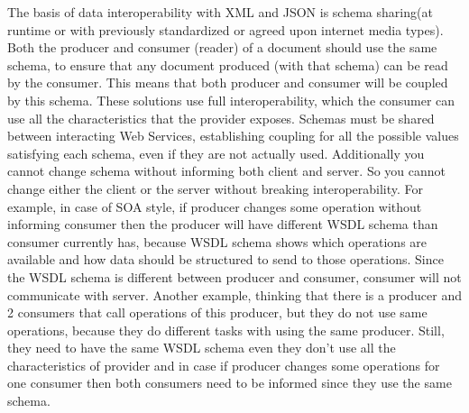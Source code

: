 The basis of data interoperability with XML and JSON is schema sharing(at runtime or with previously standardized or agreed upon internet media types). Both the producer and consumer (reader) of a document should use the same schema, to ensure that any document produced (with that schema) can be read by the consumer. This means that both producer and consumer will be coupled by this schema. These solutions use full interoperability, which the consumer can use all the characteristics that the provider exposes. Schemas must be shared between interacting Web Services, establishing coupling for all the possible values satisfying each schema, even if they are not actually used. Additionally you cannot change schema without informing both client and server. So you cannot change either the client or the server without breaking interoperability. For example, in case of SOA style, if producer changes some operation without informing consumer then the producer will have different WSDL schema than consumer currently has, because WSDL schema shows which operations are available and how data should be structured to send to those operations. Since the WSDL schema is different between producer and consumer, consumer will not communicate with server. Another example, thinking that there is a producer and 2 consumers that call operations of this producer, but they do not use same operations, because they do different tasks with using the same producer. Still, they need to have the same WSDL schema even they don't use all the characteristics of provider and in case if producer changes some operations for one consumer then both consumers need to be informed since they use the same schema.

